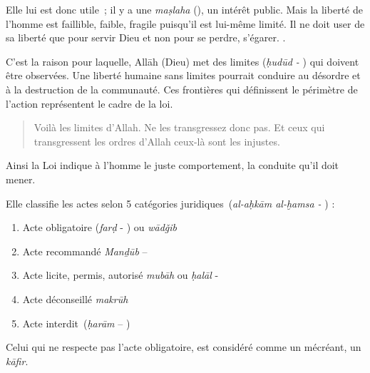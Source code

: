 Elle lui est donc utile~; il y a une \emph{maṣlaha} (), un
intérêt public. 
Mais la liberté de l'homme est faillible, faible,
fragile puisqu'il est lui-même limité. Il ne doit user de sa liberté que
pour servir Dieu et non pour se perdre, s'égarer.
.

C'est la raison pour laquelle, Allāh (Dieu) met des limites (\emph{ḥudūd
-} ) qui doivent être observées. Une liberté humaine sans
limites pourrait conduire au désordre et à la destruction de la
communauté. Ces frontières qui définissent le périmètre de l'action
représentent le cadre de la loi.



\begin{quote}

Voilà les limites d'Allah. Ne les transgressez donc pas. Et ceux qui
transgressent les ordres d'Allah ceux-là sont les injustes.
\end{quote}

Ainsi la Loi indique à l'homme le juste comportement, la conduite qu'il
doit mener. 
\begin{Def}

Elle classifie les actes selon 5 catégories
juridiques~(\emph{al-aḥkām al-ḫamsa -} ) :

\begin{enumerate}
\def\labelenumi{\arabic{enumi}.}
\item
  Acte obligatoire (\emph{farḍ} - ) ou \emph{wādǧib} 
\item
  Acte recommandé \emph{Manḏūb} -- 
\item
  Acte licite, permis, autorisé \emph{mubāh} ou \emph{ḥalāl} - 
\item
  Acte déconseillé \emph{makrūh} 
\item
  Acte interdit~(\emph{ḥarām} -- )
\end{enumerate}
\end{Def}

\begin{Def}[kāfir]
Celui qui ne respecte pas l'acte obligatoire, est considéré comme un
mécréant, un \emph{kāfir}.
\end{Def}

